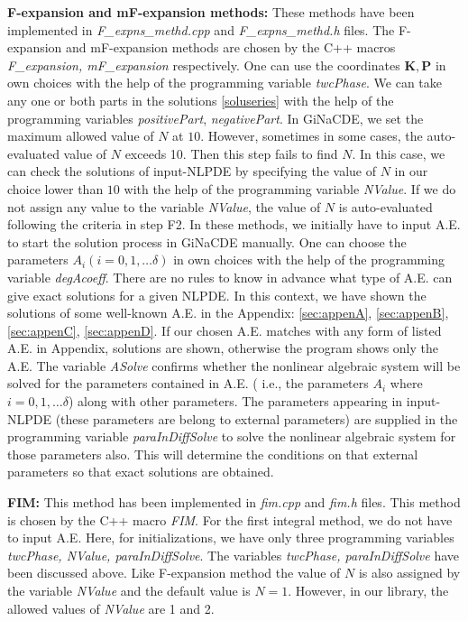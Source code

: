 \documentclass[prd,aps,floats,showkeys,nofootinbib,notitlepage]{revtex4-2}
\begin{document}
	\textbf{F-expansion and mF-expansion methods:} These methods have been implemented in \textit{F\_expns\_methd.cpp} and \textit{F\_expns\_methd.h} files.
	The F-expansion and mF-expansion methods are chosen by the C++ macros {\em F\_expansion, mF\_expansion} respectively. 
	One can use the coordinates $\boldsymbol{K},\boldsymbol{P}$ in own choices with the help of the programming variable \textit{twcPhase}.
	We can take any one or both parts in the solutions \eqref{soluseries} with the help of the programming variables \textit{positivePart}, \textit{negativePart}. In GiNaCDE, we set the maximum allowed value of $N$ at $10$. However, sometimes in some cases, the auto-evaluated value of $N$ exceeds 10. Then this step fails to find $N$.
	In this case, we can check the solutions of input-NLPDE by specifying the value of $N$ in our choice lower than $10$ with the help of the programming variable {\em NValue}. If we do not assign any value to the variable {\em NValue}, the value of $N$ is auto-evaluated following the criteria in step F2.
	In these methods, we initially have to input A.E. to start the solution process in GiNaCDE manually. One can choose the parameters $A_i(i=0,1,\ldots \delta)$ in own choices with the help of the programming variable \textit{degAcoeff}. There are no rules to know in advance what type of A.E. can give exact solutions for a given NLPDE. In this context, we have shown the solutions of some well-known A.E. in the Appendix: \ref{sec:appenA}, \ref{sec:appenB}, \ref{sec:appenC}, \ref{sec:appenD}. If our chosen A.E. matches with any form of listed A.E. in Appendix, solutions are shown, otherwise the program shows only the A.E.
	The variable {\em ASolve} confirms whether the nonlinear algebraic system will be solved for the parameters contained in A.E. ( i.e., the parameters $A_i$ where $i=0,1,\ldots \delta$) along with other parameters. The parameters appearing in input-NLPDE (these parameters are belong to external parameters) are supplied in the programming variable {\em paraInDiffSolve} to solve the nonlinear algebraic system for those parameters also.
	This will determine the conditions on that external parameters so that exact solutions are obtained.
	
	\textbf{FIM:} This method has been implemented in \textit{fim.cpp} and \textit{fim.h} files. This method is chosen by the C++ macro {\em FIM}. For the first integral method, we do not have to input A.E. Here, for initializations, we have only three programming variables \textit{twcPhase, NValue, paraInDiffSolve}. The variables \textit{twcPhase, paraInDiffSolve} have been discussed above. Like F-expansion method the value of $N$ is also assigned by the variable {\em NValue} and the default value is $N=1$. However, in our library, the allowed values of {\em NValue} are 1 and 2. 
	
\end{document}
